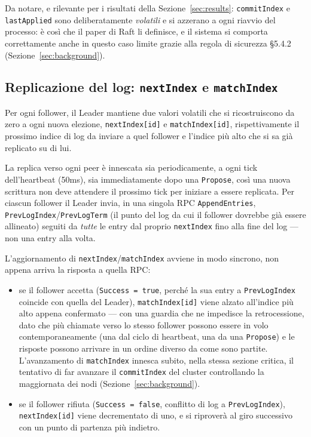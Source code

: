 \documentclass[conference]{IEEEtran}
\begin{document}
Da notare, e rilevante per i risultati della Sezione~\ref{sec:results}:
\texttt{commitIndex} e \texttt{lastApplied} sono deliberatamente
\emph{volatili} e si azzerano a ogni riavvio del
processo: è così che il paper di Raft li definisce, e
il sistema si comporta correttamente anche in questo caso limite grazie
alla regola di sicurezza \S5.4.2 (Sezione~\ref{sec:background}).

\subsection{Replicazione del log: \texttt{nextIndex} e \texttt{matchIndex}}

Per ogni follower, il Leader mantiene due valori volatili che si ricostruiscono da zero a ogni nuova elezione, \texttt{nextIndex[id]} e
\texttt{matchIndex[id]}, rispettivamente il prossimo indice di log da
inviare a quel follower e l'indice più alto che si sa già replicato su di
lui.

La replica verso ogni peer è innescata sia periodicamente, a ogni tick
dell'heartbeat (50ms), sia immediatamente dopo una \texttt{Propose}, così
una nuova scrittura non deve attendere il prossimo tick per iniziare a
essere replicata. Per ciascun follower il Leader invia, in una singola RPC
\texttt{AppendEntries}, \texttt{PrevLogIndex}/\texttt{PrevLogTerm} (il
punto del log da cui il follower dovrebbe già essere allineato) seguiti da
\emph{tutte} le entry dal proprio \texttt{nextIndex} fino alla fine del
log — non una entry alla volta.

L'aggiornamento di \texttt{nextIndex}/\texttt{matchIndex} avviene in modo
sincrono, non appena arriva la risposta a quella RPC:

\begin{itemize}
  \item se il follower accetta (\texttt{Success = true}, perché la sua
  entry a \texttt{PrevLogIndex} coincide con quella del Leader),
  \texttt{matchIndex[id]} viene alzato all'indice più alto appena
  confermato — con una guardia che ne impedisce la retrocessione, dato che
  più chiamate verso lo stesso follower possono essere in volo
  contemporaneamente (una dal ciclo di heartbeat, una da una
  \texttt{Propose}) e le risposte possono arrivare in un ordine diverso da
  come sono partite. L'avanzamento di \texttt{matchIndex} innesca subito,
  nella stessa sezione critica, il tentativo di far avanzare il
  \texttt{commitIndex} del cluster controllando la maggiornata dei nodi (Sezione~\ref{sec:background}).
  \item se il follower rifiuta (\texttt{Success = false}, conflitto di log
  a \texttt{PrevLogIndex}), \texttt{nextIndex[id]} viene decrementato di
  uno, e si riproverà al giro successivo con un punto di partenza più
  indietro.
\end{itemize}
\end{document}
